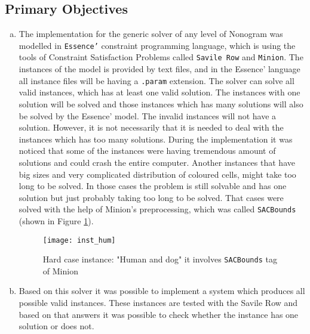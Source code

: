 \subsection{Primary Objectives}
\label{subsec:primary_obj}
\begin{enumerate}[(a)]
    \item The implementation for the generic solver of any level of Nonogram was modelled in \texttt{Essence'} constraint programming language, which is using the tools of Constraint Satisfaction Problems called \texttt{Savile Row} and \texttt{Minion}. The instances of the model is provided by text files, and in the Essence' language all instance files will be having a \texttt{.param} extension. 
    The solver can solve all valid instances, which has at least one valid solution. The instances with one solution will be solved and those instances which has many solutions will also be solved by the Essence' model. The  invalid instances will not have a solution. However, it is not necessarily that it is needed to deal with the instances which has too many solutions. During the implementation it was noticed that some of the instances were having tremendous amount of solutions and could crash the entire computer. Another instances that have big sizes and very complicated distribution of coloured cells, might take too long to be solved. In those cases the problem is still solvable and has one solution but just probably taking too long to be solved. That cases were solved with the help of Minion's preprocessing, which was called \texttt{SACBounds} (shown in Figure \ref{fig:humananddog}). 

    \begin{figure}[tb]
    	\centering
    	\texttt{[image: inst\_hum]}
    	\caption{Hard case instance: "Human and dog" it involves \texttt{SACBounds} tag of Minion}
    	\label{fig:humananddog}
    \end{figure}


    \item Based on this solver it was possible to implement a system which produces all possible valid instances. These instances are tested with the Savile Row and based on that answers it was possible to check whether the instance has one solution or does not. 
\end{enumerate}

